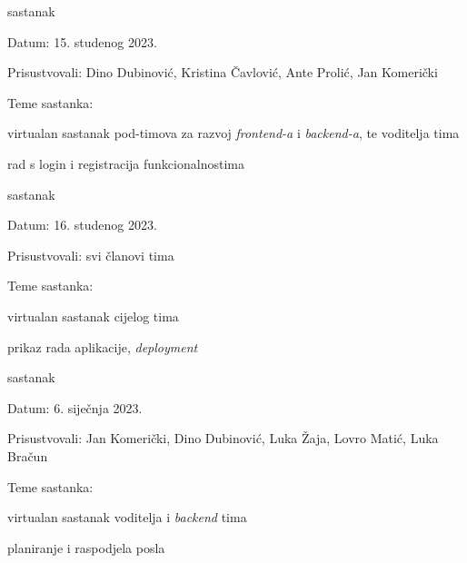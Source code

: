 \begin{packed_enum}
			\item  sastanak
			\item[] \begin{packed_item}
				\item Datum: 15. studenog 2023.
				\item Prisustvovali: Dino Dubinović, Kristina Čavlović, Ante Prolić, Jan Komerički
				\item Teme sastanka:
				\begin{packed_item}
					\item  virtualan sastanak pod-timova za razvoj \textit{frontend-a} i \textit{backend-a}, te voditelja tima
					\item  rad s login i registracija funkcionalnostima
				\end{packed_item}
			\end{packed_item}
			
			\item  sastanak
			\item[] \begin{packed_item}
				\item Datum: 16. studenog 2023.
				\item Prisustvovali: svi članovi tima
				\item Teme sastanka:
				\begin{packed_item}
					\item  virtualan sastanak cijelog tima
					\item  prikaz rada aplikacije, \textit{deployment}
				\end{packed_item}
			\end{packed_item}
			
			\item  sastanak
			\item[] \begin{packed_item}
				\item Datum: 6. siječnja 2023.
				\item Prisustvovali: Jan Komerički, Dino Dubinović, Luka Žaja, Lovro Matić, Luka Bračun
				\item Teme sastanka:
				\begin{packed_item}
					\item  virtualan sastanak voditelja i \textit{backend} tima
					\item  planiranje i raspodjela posla
				\end{packed_item}
			\end{packed_item}
			

\end{packed_enum}
